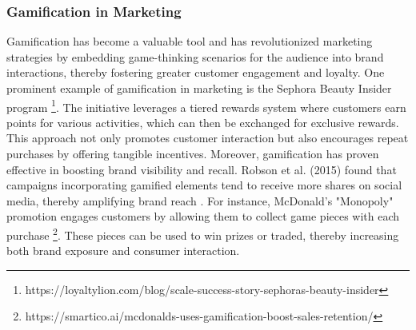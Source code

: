 \subsubsection{Gamification in Marketing}

Gamification has become a valuable tool and has revolutionized marketing strategies by embedding game-thinking scenarios for the audience into brand interactions, thereby fostering greater customer engagement and loyalty\cite{redefinition}. 
One prominent example of gamification in marketing is the Sephora Beauty Insider program \footnote{https://loyaltylion.com/blog/scale-success-story-sephoras-beauty-insider}. 
The initiative leverages a tiered rewards system where customers earn points for various activities, which can then be exchanged for exclusive rewards. 
This approach not only promotes customer interaction but also encourages repeat purchases by offering tangible incentives. Moreover, gamification has proven effective in boosting brand visibility and recall. 
Robson et al. (2015) found that campaigns incorporating gamified elements tend to receive more shares on social media, thereby amplifying brand reach \cite{gameon}. 
For instance, McDonald's "Monopoly" promotion engages customers by allowing them to collect game pieces with each purchase \footnote{https://smartico.ai/mcdonalds-uses-gamification-boost-sales-retention/}. 
These pieces can be used to win prizes or traded, thereby increasing both brand exposure and consumer interaction.

